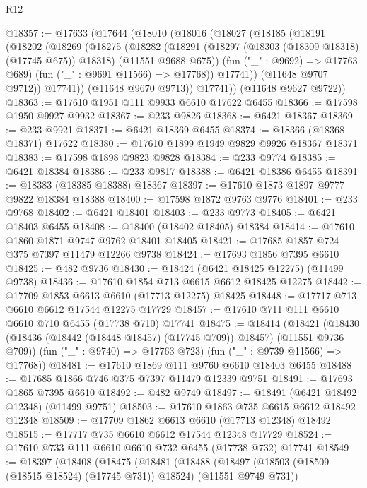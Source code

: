 \begin{lexlean}{R12}
\begin{coremodule}
@18357 := @17633
    (@17644
      (@18010
        (@18016
          (@18027
            (@18185
              (@18191
                (@18202
                  (@18269
                    (@18275
                      (@18282
                        (@18291
                          (@18297 (@18303 (@18309 @18318) (@17745 @675)) @18318)
                          (@11551 @9688 @675))
                        (fun ("_" : @9692) => @17763 @689)
                        (fun ("_" : @9691 @11566) => @17768))
                      @17741))
                  (@11648 @9707 @9712))
                @17741))
            (@11648 @9670 @9713))
          @17741))
      (@11648 @9627 @9722))
@18363 := @17610 @1951 @111 @9933 @6610 @17622 @6455
@18366 := @17598 @1950 @9927 @9932
@18367 := @233 @9826
@18368 := @6421 @18367
@18369 := @233 @9921
@18371 := @6421 @18369 @6455
@18374 := @18366 (@18368 @18371) @17622
@18380 := @17610 @1899 @1949 @9829 @9926 @18367 @18371
@18383 := @17598 @1898 @9823 @9828
@18384 := @233 @9774
@18385 := @6421 @18384
@18386 := @233 @9817
@18388 := @6421 @18386 @6455
@18391 := @18383 (@18385 @18388) @18367
@18397 := @17610 @1873 @1897 @9777 @9822 @18384 @18388
@18400 := @17598 @1872 @9763 @9776
@18401 := @233 @9768
@18402 := @6421 @18401
@18403 := @233 @9773
@18405 := @6421 @18403 @6455
@18408 := @18400 (@18402 @18405) @18384
@18414 := @17610 @1860 @1871 @9747 @9762 @18401 @18405
@18421 := @17685 @1857 @724 @375 @7397 @11479 @12266 @9738
@18424 := @17693 @1856 @7395 @6610
@18425 := @482 @9736
@18430 := @18424 (@6421 @18425 @12275) (@11499 @9738)
@18436 := @17610 @1854 @713 @6615 @6612 @18425 @12275
@18442 := @17709 @1853 @6613 @6610 (@17713 @12275) @18425
@18448 := @17717 @713 @6610 @6612 @17544 @12275 @17729
@18457 := @17610 @711 @111 @6610 @6610 @710 @6455 (@17738 @710) @17741
@18475 := @18414
    (@18421
      (@18430 (@18436 (@18442 (@18448 @18457) (@17745 @709)) @18457) (@11551 @9736 @709))
      (fun ("_" : @9740) => @17763 @723)
      (fun ("_" : @9739 @11566) => @17768))
@18481 := @17610 @1869 @111 @9760 @6610 @18403 @6455
@18488 := @17685 @1866 @746 @375 @7397 @11479 @12339 @9751
@18491 := @17693 @1865 @7395 @6610
@18492 := @482 @9749
@18497 := @18491 (@6421 @18492 @12348) (@11499 @9751)
@18503 := @17610 @1863 @735 @6615 @6612 @18492 @12348
@18509 := @17709 @1862 @6613 @6610 (@17713 @12348) @18492
@18515 := @17717 @735 @6610 @6612 @17544 @12348 @17729
@18524 := @17610 @733 @111 @6610 @6610 @732 @6455 (@17738 @732) @17741
@18549 := @18397
    (@18408
      (@18475
        (@18481
          (@18488
            (@18497 (@18503 (@18509 (@18515 @18524) (@17745 @731)) @18524) (@11551 @9749 @731))

\end{coremodule}
\end{lexlean}
